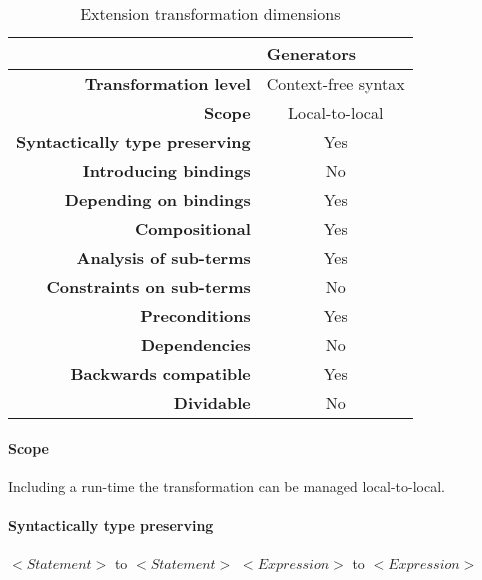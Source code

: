 \documentclass[10pt,a4paper]{article}
\begin{document}
\begin{table}[H]
\centering
\caption{Extension transformation dimensions}
\label{generators-table}
\begin{tabular}{@{}rc@{}}
\toprule
                                       & \multicolumn{1}{l}{\textbf{Generators}} \\ \midrule
\textbf{Transformation level}          & Context-free syntax                          \\
\textbf{Scope}                         & Local-to-local                               \\
\textbf{Syntactically type preserving} & Yes                                          \\
\textbf{Introducing bindings}          & No                                          \\%
\textbf{Depending on bindings}         & Yes                                           \\
\textbf{Compositional}                 & Yes                                          \\
\textbf{Analysis of sub-terms}          & Yes                                          \\
\textbf{Constraints on sub-terms}       & No                                           \\
\textbf{Preconditions}                 & Yes                                          \\
\textbf{Dependencies}                  & No                                           \\
\textbf{Backwards compatible}          & Yes                                          \\
\textbf{Dividable}                     & No                                           \\ \bottomrule
\end{tabular}
\end{table}

\paragraph{Scope}
Including a run-time the transformation can be managed local-to-local.

\paragraph{Syntactically type preserving}
$<Statement>$ to $<Statement>$
$<Expression>$ to $<Expression>$
\end{document}
